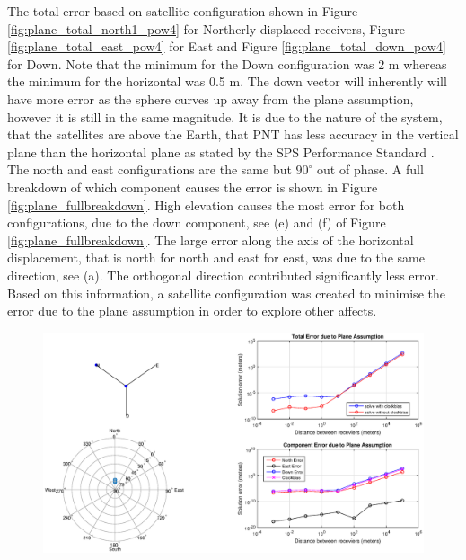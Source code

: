 The total error based on satellite configuration shown in Figure \ref{fig:plane_total_north1_pow4} for Northerly displaced receivers, Figure \ref{fig:plane_total_east_pow4} for East and Figure \ref{fig:plane_total_down_pow4} for Down. Note that the minimum for the Down configuration was 2 m whereas the minimum for the horizontal was 0.5 m. The down vector will inherently will have more error as the sphere curves up away from the plane assumption, however it is still in the same magnitude. It is due to the nature of the system, that the satellites are above the Earth, that PNT has less accuracy in the vertical plane than the horizontal plane as stated by the SPS Performance Standard \cite{officalperformance}. The north and east configurations are the same but $90^\circ$ out of phase. A full breakdown of which component causes the error is shown in Figure \ref{fig:plane_fullbreakdown}. High elevation causes the most error for both configurations, due to the down component, see (e) and (f) of Figure \ref{fig:plane_fullbreakdown}. The large error along the axis of the horizontal displacement, that is north for north and east for east, was due to the same direction, see (a). The orthogonal direction contributed significantly less error.\\

Based on this information, a satellite configuration was created to minimise the error due to the plane assumption in order to explore other affects.


\begin{figure}
\centering
\caption{}
\label{fig:plane_ALLE_north_0075}
\includegraphics[trim = 3cm 0 0 0,clip,width=\linewidth]{ChapterExperiments/Figures/plane_ALLE_north_0075}
\end{figure}

